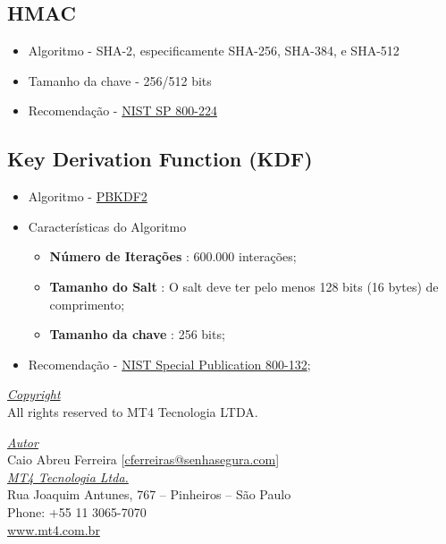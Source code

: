 \subsection{HMAC}
	\begin{itemize}
		\item Algoritmo - SHA-2, especificamente SHA-256, SHA-384, e SHA-512
		\item Tamanho da chave - 256/512 bits
		\item Recomendação - \href{https://csrc.nist.gov/pubs/sp/800/224/ipd}{NIST SP 800-224}
	\end{itemize}

\subsection{Key Derivation Function (KDF)}
	\begin{itemize}
		\item Algoritmo -  \href{https://www.rfc-editor.org/rfc/rfc8018.html}{PBKDF2}
		\item Características do Algoritmo
		\begin{itemize}
			\item \textbf{Número de Iterações} : 600.000 interações;
			\item \textbf{Tamanho do Salt} : O salt deve ter pelo menos 128 bits (16 bytes) de comprimento;
			\item \textbf{Tamanho da chave} : 256 bits;
		\end{itemize}
		\item Recomendação - \href{https://csrc.nist.gov/publications/detail/sp/800-132/final}{NIST Special Publication 800-132};
	\end{itemize}

\pagebreak

\vspace*{\fill}
\begin{flushright}
	\underline{\textit{Copyright}}\\
	All rights reserved to MT4 Tecnologia LTDA.\bigskip

	\underline{\textit{Autor}}\\
	Caio Abreu Ferreira [\href{mailto:cferreira@senhasegura.com}{cferreiras@senhasegura.com}] \bigskip\\
	
	\underline{\textit{MT4 Tecnologia Ltda.}}\\
	Rua Joaquim Antunes, 767 – Pinheiros – São Paulo\\
	Phone: +55 11 3065-7070\\
	\url{www.mt4.com.br}\\
\end{flushright}
